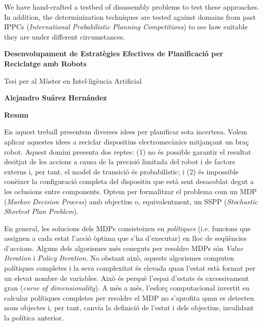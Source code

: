 We have hand-crafted a testbed of disassembly problems to test these
approaches. In addition, the determinization techniques are tested
against domains
from past IPPCs (\emph{International Probabilistic Planning Competitions})
to see how suitable they are under different circumstances.



\cleardoublepage

\thispagestyle{plain}
\begin{center}
	\Large
	\textbf{Desenvolupament de Estratègies Efectives de Planificació per Reciclatge amb Robots}
	
	\vspace{0.4cm}
	\large
	Tesi per al Màster en Intel$\cdot$ligència Artificial
	
	\vspace{0.4cm}
	\textbf{Alejandro Suárez Hernández}
	
	\vspace{0.9cm}
	\textbf{Resum}
\end{center}

En aquest treball presentem diverses idees per planificar sota incertesa.
Volem aplicar aquestes idees a reciclar dispositius electromecànics
mitjançant un braç robot. Aquest domini presenta dos reptes: (1) no és possible
garantir el resultat desitjat de les accions a causa de la precisió limitada
del robot i de factors externs i, per tant, el model de transició és probabilístic;
i (2) és impossible conèixer la configuració completa del dispositiu
que està sent desacoblat degut a les oclusions entre components.
Optem per formalitzar el problema com un MDP (\emph{Markov Decision Process}) amb
objectius o, equivalentment, un SSPP (\emph{Stochastic Shortest Plan Problem}).

En general, les solucions dels MDPs consisteixen en \emph{polítiques}
(i.e. funcions
que assignen a cada estat l'acció òptima que s'ha d'executar) en lloc de
seqüències d'accions. Alguns dels algorismes més coneguts per resoldre
MDPs són \emph{Value Iteration} i \emph{Policy Iteration}.
No obstant això, aquests algorismes
computen polítiques completes i la seva complexitat és elevada quan l'estat
està format per un elevat nombre de variables. Això és perquè l'espai
d'estats és excessivament gran (\emph{curse of dimensionality}). A més
a més,
l'esforç computacional invertit en calcular polítiques completes per
resoldre el MDP no s'aprofita quan es detecten nous objectes i, per
tant, canvia la definició de l'estat i dels objectius, invalidant la
política anterior.

